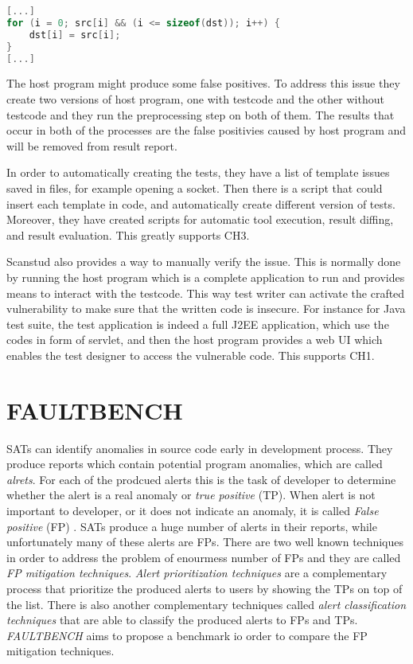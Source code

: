 \documentclass[authoryear,preprint]{sigplanconf}
\begin{document}
\begin{lstlisting}[float,caption=Off-by-one vulnerability caused by insecure loop condition \cite{Scanstud} ,label=ls:sourcec,language=C]
[...]
for (i = 0; src[i] && (i <= sizeof(dst)); i++) {
	dst[i] = src[i];
}
[...]
\end{lstlisting}

The host program might produce some false positives. To address this issue they create two versions of host program, one with testcode and the other without testcode and they run the preprocessing step on both of them. The results that occur in both of the processes are the false positivies caused by host program and will be removed from result report. 

In order to automatically creating the tests, they have a list of template issues saved in files, for example opening a socket. Then there is a script that could insert each template in code, and automatically create different version of tests. Moreover, they have created scripts for automatic tool execution, result diffing, and result evaluation. This greatly supports CH3.

Scanstud also provides a way to manually verify the issue. This is normally done by running the host program which is a complete application to run and provides means to interact with the testcode. This way test writer can activate the crafted vulnerability to make sure that the written code is insecure. For instance for Java test suite, the test application is indeed a full J2EE application, which use the codes in form of servlet, and then the host program provides a web UI which enables the test designer to access the vulnerable code. This supports CH1.

\section{FAULTBENCH}
\label{sec:sec_FAULTBENCH}
SATs can identify anomalies in source code early in development process. They produce reports which contain potential program anomalies, which are called \textit{alrets}. For each of the prodcued alerts this is the task of developer to determine whether the alert is a real anomaly or \textit{true positive} (TP). When alert is not important to developer, or it does not indicate an anomaly, it is called \textit{False positive} (FP) \cite{ayewah2007evaluating}. SATs produce a huge  number of alerts in their reports, while unfortunately many of these alerts are FPs. There are two well known techniques in order to address the problem of enourmess number of FPs and they are called \textit{FP mitigation techniques}. \textit{Alert prioritization techniques} are a complementary process that prioritize the produced alerts to users by showing the TPs on top of the list. There is also another complementary techniques called  \textit{alert classification techniques} that are able to classify the produced alerts to FPs and TPs. \textit{FAULTBENCH} \cite{heckman2008establishing} aims to propose a benchmark io order to compare the FP mitigation techniques. 
\end{document}

